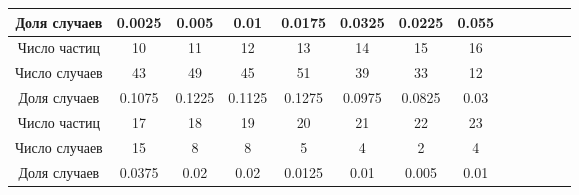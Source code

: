 \documentclass[a4paper, 12pt]{article}
\begin{document}
\begin{enumerate}
\begin{center}
\begin{longtable}{|c|c|c|c|c|c|c|c|c|c|c|c|c|}
				\hline
				Доля случаев & 0.0025 & 0.005 & 0.01 & 0.0175 & 0.0325 & 0.0225 & 0.055\\
				\hline
				\hline
				Число частиц & 10 & 11 & 12 & 13 & 14 & 15 & 16\\
				\hline
				Число случаев & 43 & 49 & 45 & 51 & 39 & 33 & 12\\
				\hline
				Доля случаев & 0.1075 & 0.1225 & 0.1125 & 0.1275 & 0.0975 & 0.0825 & 0.03 \\
				\hline
				\hline
				Число частиц & 17 & 18 & 19 & 20 & 21 & 22 & 23\\
				\hline
				Число случаев & 15 & 8 & 8 & 5 & 4 & 2 & 4\\ 
				\hline
				Доля случаев & 0.0375 & 0.02 & 0.02 & 0.0125 & 0.01 & 0.005 & 0.01\\
				\hline
			\end{longtable}
		\end{center}
		

\end{enumerate}
\end{document}
